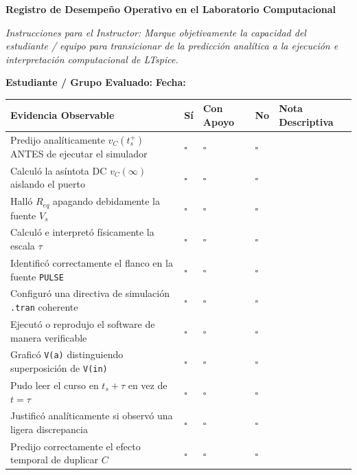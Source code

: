 \documentclass[11pt, a4paper]{article}
\begin{document}
\begin{tcolorbox}[colback=ucbblue!5!white, colframe=ucbblue, title=\textbf{Lista de Observación: Validaciones en Simulación Transitoria}]
    \centering \textbf{Registro de Desempeño Operativo en el Laboratorio Computacional}
\end{tcolorbox}

\noindent \textit{Instrucciones para el Instructor: Marque objetivamente la capacidad del estudiante / equipo para transicionar de la predicción analítica a la ejecución e interpretación computacional de LTspice.}

\vspace{0.4cm}
\textbf{Estudiante / Grupo Evaluado:} \hrulefill \quad \textbf{Fecha:} \hrulefill

\vspace{0.4cm}
\renewcommand{\arraystretch}{1.6}
\noindent
\begin{tabularx}{\textwidth}{>{\RaggedRight\arraybackslash}X >{\centering\arraybackslash}p{1.2cm} >{\centering\arraybackslash}p{1.8cm} >{\centering\arraybackslash}p{1.2cm} >{\RaggedRight\arraybackslash}p{3cm}}
\toprule
\textbf{Evidencia Observable} & \textbf{Sí} & \textbf{Con Apoyo} & \textbf{No} & \textbf{Nota Descriptiva} \\ 
\midrule
Predijo analíticamente $v_C(t_s^+)$ ANTES de ejecutar el simulador & $\square$ & $\square$ & $\square$ & \\ \addlinespace
Calculó la asíntota DC $v_C(\infty)$ aislando el puerto & $\square$ & $\square$ & $\square$ & \\ \addlinespace
Halló $R_{eq}$ apagando debidamente la fuente $V_s$ & $\square$ & $\square$ & $\square$ & \\ \addlinespace
Calculó e interpretó físicamente la escala $\tau$ & $\square$ & $\square$ & $\square$ & \\ \addlinespace
Identificó correctamente el flanco en la fuente \texttt{PULSE} & $\square$ & $\square$ & $\square$ & \\ \addlinespace
Configuró una directiva de simulación \texttt{.tran} coherente & $\square$ & $\square$ & $\square$ & \\ \addlinespace
Ejecutó o reprodujo el software de manera verificable & $\square$ & $\square$ & $\square$ & \\ \addlinespace
Graficó \texttt{V(a)} distinguiendo superposición de \texttt{V(in)} & $\square$ & $\square$ & $\square$ & \\ \addlinespace
Pudo leer el curso en $t_s + \tau$ en vez de $t=\tau$ & $\square$ & $\square$ & $\square$ & \\ \addlinespace
Justificó analíticamente si observó una ligera discrepancia & $\square$ & $\square$ & $\square$ & \\ \addlinespace
Predijo correctamente el efecto temporal de duplicar $C$ & $\square$ & $\square$ & $\square$ & \\ 
\bottomrule
\end{tabularx}
\end{document}
